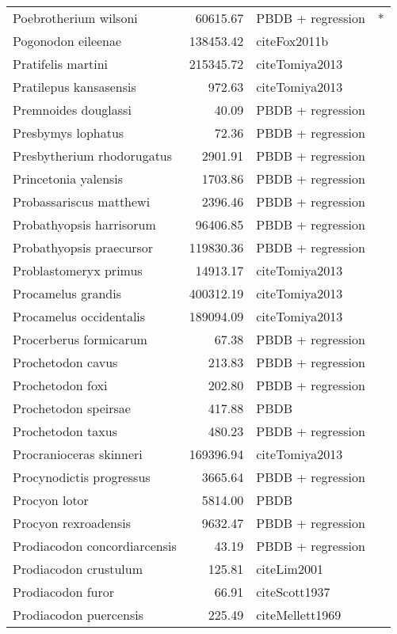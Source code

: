 \begin{table}[ht]
\begin{tabular}{lrll}
  Poebrotherium wilsoni & 60615.67 & PBDB + regression & * \\ 
  Pogonodon eileenae & 138453.42 & cite{Fox2011b} &  \\ 
  Pratifelis martini & 215345.72 & cite{Tomiya2013} &  \\ 
  Pratilepus kansasensis & 972.63 & cite{Tomiya2013} &  \\ 
  Premnoides douglassi & 40.09 & PBDB + regression &  \\ 
  Presbymys lophatus & 72.36 & PBDB + regression &  \\ 
  Presbytherium rhodorugatus & 2901.91 & PBDB + regression &  \\ 
  Princetonia yalensis & 1703.86 & PBDB + regression &  \\ 
  Probassariscus matthewi & 2396.46 & PBDB + regression &  \\ 
  Probathyopsis harrisorum & 96406.85 & PBDB + regression &  \\ 
  Probathyopsis praecursor & 119830.36 & PBDB + regression &  \\ 
  Problastomeryx primus & 14913.17 & cite{Tomiya2013} &  \\ 
  Procamelus grandis & 400312.19 & cite{Tomiya2013} &  \\ 
  Procamelus occidentalis & 189094.09 & cite{Tomiya2013} &  \\ 
  Procerberus formicarum & 67.38 & PBDB + regression &  \\ 
  Prochetodon cavus & 213.83 & PBDB + regression &  \\ 
  Prochetodon foxi & 202.80 & PBDB + regression &  \\ 
  Prochetodon speirsae & 417.88 & PBDB &  \\ 
  Prochetodon taxus & 480.23 & PBDB + regression &  \\ 
  Procranioceras skinneri & 169396.94 & cite{Tomiya2013} &  \\ 
  Procynodictis progressus & 3665.64 & PBDB + regression &  \\ 
  Procyon lotor & 5814.00 & PBDB &  \\ 
  Procyon rexroadensis & 9632.47 & PBDB + regression &  \\ 
  Prodiacodon concordiarcensis & 43.19 & PBDB + regression &  \\ 
  Prodiacodon crustulum & 125.81 & cite{Lim2001} &  \\ 
  Prodiacodon furor & 66.91 & cite{Scott1937} &  \\ 
  Prodiacodon puercensis & 225.49 & cite{Mellett1969} &  \\ 

\end{tabular}
\end{table}
